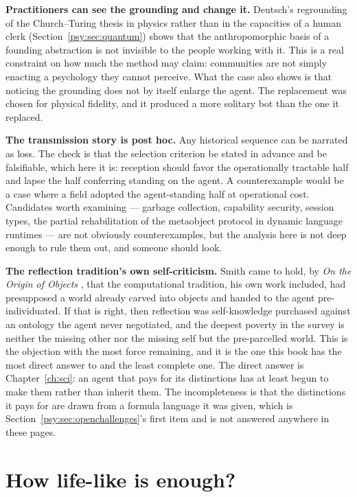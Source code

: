 \textbf{Practitioners can see the grounding and change it.}
Deutsch's regrounding of the Church--Turing thesis in physics rather
than in the capacities of a human clerk
(Section~\ref{psy:sec:quantum}) shows that the anthropomorphic basis
of a founding abstraction is not invisible to the people working
with it.
This is a real constraint on how much the method may claim:
communities are not simply enacting a psychology they cannot
perceive.
What the case also shows is that noticing the grounding does not by
itself enlarge the agent.
The replacement was chosen for physical fidelity, and it produced a
more solitary bot than the one it replaced.

\textbf{The transmission story is post hoc.}
Any historical sequence can be narrated as loss.
The check is that the selection criterion be stated in advance and
be falsifiable, which here it is: reception should favor the
operationally tractable half and lapse the half conferring standing
on the agent.
A counterexample would be a case where a field adopted the
agent-standing half at operational cost.
Candidates worth examining --- garbage collection, capability
security, session types, the partial rehabilitation of the
metaobject protocol in dynamic language runtimes --- are not
obviously counterexamples, but the analysis here is not deep enough
to rule them out, and someone should look.

\textbf{The reflection tradition's own self-criticism.}
Smith came to hold, by \emph{On the Origin of Objects}
\cite{smith1996}, that the computational tradition, his own work
included, had presupposed a world already carved into objects and
handed to the agent pre-individuated.
If that is right, then reflection was self-knowledge purchased
against an ontology the agent never negotiated, and the deepest
poverty in the survey is neither the missing other nor the missing
self but the pre-parcelled world.
This is the objection with the most force remaining, and it is the
one this book has the most direct answer to and the least complete
one.
The direct answer is Chapter~\ref{ch:sci}: an agent that pays for
its distinctions has at least begun to make them rather than inherit
them.
The incompleteness is that the distinctions it pays for are drawn
from a formula language it was given, which is
Section~\ref{psy:sec:openchallenges}'s first item and is not
answered anywhere in these pages.

\section{How life-like is enough?}
\label{psy:sec:threshold}

